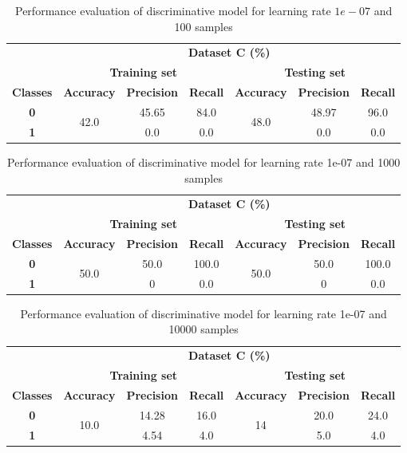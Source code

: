 \documentclass{article}
\begin{document}
\begin{table}[h]
  \centering
  \caption{Performance evaluation of discriminative model for learning rate $1e-07$ and 100 samples} \label{tab:4}
  \begin{tabular}{ccccccc}
  \cline{2-7}
  & \multicolumn{6}{c}{\textbf{Dataset C (\%)}} \\ \cline{2-7}
  & \multicolumn{3}{c}{\textbf{Training set}} & \multicolumn{3}{c}{\textbf{Testing set}} \\ \hline
  \textbf{Classes} & \textbf{Accuracy} & \textbf{Precision} & \textbf{Recall} & \textbf{Accuracy} & \textbf{Precision} & \textbf{Recall} \\ \hline
  \textbf{0} & \multirow{2}{*}{42.0} & 45.65 & 84.0 & \multirow{2}{*}{48.0} & 48.97 & 96.0 \\ \cline{1-1} \cline{3-4} \cline{6-7} 
  \textbf{1} &  & 0.0 & 0.0 &  & 0.0 & 0.0 \\ \hline
  \end{tabular}
  \end{table}
  
  \begin{table}[h]
  \centering
  \caption{Performance evaluation of discriminative model for learning rate 1e-07 and 1000 samples} \label{tab:5}
  \begin{tabular}{ccccccc}
  \cline{2-7}
  & \multicolumn{6}{c}{\textbf{Dataset C (\%)}} \\ \cline{2-7}
  & \multicolumn{3}{c}{\textbf{Training set}} & \multicolumn{3}{c}{\textbf{Testing set}} \\ \hline
  \textbf{Classes} & \textbf{Accuracy} & \textbf{Precision} & \textbf{Recall} & \textbf{Accuracy} & \textbf{Precision} & \textbf{Recall} \\ \hline
  \textbf{0} & \multirow{2}{*}{50.0} & 50.0 & 100.0 & \multirow{2}{*}{50.0} & 50.0 & 100.0 \\ \cline{1-1} \cline{3-4} \cline{6-7} 
  \textbf{1} &  & 0 & 0.0 &  & 0 & 0.0 \\ \hline
  \end{tabular}
  \end{table}
  
  \begin{table}[h]
  \centering
  \caption{Performance evaluation of discriminative model for learning rate 1e-07 and 10000 samples} \label{tab:6}
  \begin{tabular}{ccccccc}
  \cline{2-7}
  & \multicolumn{6}{c}{\textbf{Dataset C (\%)}} \\ \cline{2-7}
  & \multicolumn{3}{c}{\textbf{Training set}} & \multicolumn{3}{c}{\textbf{Testing set}} \\ \hline
  \textbf{Classes} & \textbf{Accuracy} & \textbf{Precision} & \textbf{Recall} & \textbf{Accuracy} & \textbf{Precision} & \textbf{Recall} \\ \hline
  \textbf{0} & \multirow{2}{*}{10.0} & 14.28 & 16.0 & \multirow{2}{*}{14} & 20.0 & 24.0 \\ \cline{1-1} \cline{3-4} \cline{6-7} 
  \textbf{1} &  & 4.54 & 4.0 &  & 5.0 & 4.0 \\ \hline
  \end{tabular}
  \end{table}
  
\end{document}
